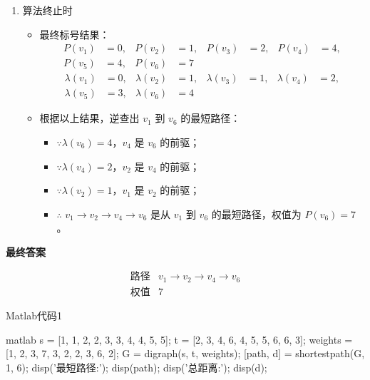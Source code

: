 \begin{enumerate}[label=(\arabic*)]
    \item 算法终止时
    \begin{itemize}
        \item 最终标号结果：
        \[
        \begin{aligned}
            P(v_1) &= 0, & P(v_2) &= 1, & P(v_3) &= 2, & P(v_4) &= 4, \\
            P(v_5) &= 4, & P(v_6) &= 7
        \end{aligned}
        \]
        \[
        \begin{aligned}
            \lambda(v_1) &= 0, & \lambda(v_2) &= 1, & \lambda(v_3) &= 1, & \lambda(v_4) &= 2, \\
            \lambda(v_5) &= 3, & \lambda(v_6) &= 4
        \end{aligned}
        \]
        \item 根据以上结果，逆查出 \( v_1 \) 到 \( v_6 \) 的最短路径：
        \begin{itemize}
            \item \(\because \lambda(v_6) = 4 \)，\( v_4 \) 是 \( v_6 \) 的前驱；
            \item \(\because \lambda(v_4) = 2 \)，\( v_2 \) 是 \( v_4 \) 的前驱；
            \item \(\because \lambda(v_2) = 1 \)，\( v_1 \) 是 \( v_2 \) 的前驱；
            \item \(\therefore\) \( v_1 \to v_2 \to v_4 \to v_6 \) 是从 \( v_1 \) 到 \( v_6 \) 的最短路径，权值为 \( P(v_6) = 7 \)。
        \end{itemize}
    \end{itemize}
\end{enumerate}

\textbf{最终答案}

\[
\boxed{\begin{array}{c|c} 
\text{路径} & v_1 \to v_2 \to v_4 \to v_6 \\ 
\hline 
\text{权值} & 7 
\end{array}}
\]
\begin{codebox}{Matlab代码}{1}
    \begin{amzcode}{matlab}
        s = [1, 1, 2, 2, 3, 3, 4, 4, 5, 5];
        t = [2, 3, 4, 6, 4, 5, 5, 6, 6, 3];
        weights = [1, 2, 3, 7, 3, 2, 2, 3, 6, 2];
        G = digraph(s, t, weights);
        [path, d] = shortestpath(G, 1, 6);
        disp('最短路径:');
        disp(path);
        disp('总距离:');
        disp(d);
    \end{amzcode}
\end{codebox}

